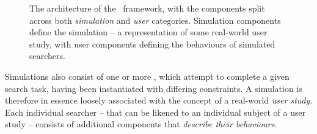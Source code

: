 \begin{figure}[t!]
    \centering
    \caption[SimIIR architecture]{The architecture of the \simiir~framework, with the components split across both \emph{simulation} and \emph{user} categories. Simulation components define the simulation – a representation of some real-world user study, with user components defining the behaviours of simulated searchers.}
    \label{fig:simiir}
\end{figure}

Simulations also consist of one or more , which attempt to complete a given search task, having been instantiated with differing constraints. A simulation is therefore in essence loosely associated with the concept of a real-world \emph{user study.} Each individual searcher -- that can be likened to an individual subject of a user study -- consists of additional components that \emph{describe their behaviours.}

